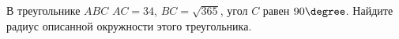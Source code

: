 \begin{ex}
	\begin{condition}
		В треугольнике \( ABC  \) \( AC=34 \), \( BC=\sqrt{365} \), угол \( C \) равен \( 90\degree  \). Найдите радиус описанной окружности этого треугольника.
	\end{condition}
\end{ex}
